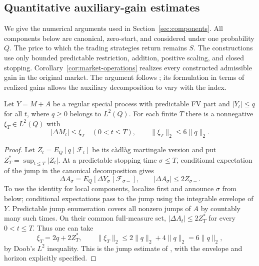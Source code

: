 \subsection{Quantitative auxiliary-gain estimates}
\label{sec:ds-estimates}
We give the numerical arguments used in Section~\ref{sec:components}.
All components below are canonical, zero-start, and considered under one
probability $Q$. The price to which the trading strategies return remains
$S$. The constructions use only bounded predictable restriction, addition,
positive scaling, and closed stopping. Corollary~\ref{cor:market-operations}
realizes every constructed admissible gain in the original market.
The argument follows \cite[Lemmas 4.7--4.10]{DS}; its formulation in terms of
realized gains allows the auxiliary decomposition to vary with the index.

\begin{lemma}\label{lem:explicit-jump-envelope}
Let $Y=M+A$ be a regular special process with predictable FV part and
$|Y_t|\leq q$ for all $t$, where $q\geq0$ belongs to $L^2(Q)$.
For each finite $T$ there is a nonnegative $\xi_T\in L^2(Q)$ with
\[
 |\Delta M_t|\leq\xi_T\quad(0<t\leq T),\qquad
 \|\xi_T\|_2\leq6\|q\|_2.
\]
\end{lemma}
\begin{proof}
Let $Z_t=E_Q[q\mid\mathcal F_t]$ be its c\`adl\`ag martingale version and put
$Z_T^*=\sup_{t\leq T}|Z_t|$.
At a predictable stopping time $\sigma\leq T$, conditional expectation of
the jump in the canonical decomposition gives
\[
 \Delta A_\sigma=E_Q[\Delta Y_\sigma\mid\mathcal F_{\sigma-}],\qquad
 |\Delta A_\sigma|\leq2Z_{\sigma-}.
\]
To use the identity for local components, localize first and announce
$\sigma$ from below; conditional expectations pass to the jump using the
integrable envelope of $Y$. Predictable jump enumeration covers all nonzero
jumps of $A$ by countably many such times. On their common full-measure set,
$|\Delta A_t|\leq2Z_T^*$ for every $0<t\leq T$.
Thus one can take
\[
 \xi_T=2q+2Z_T^*,\qquad
 \|\xi_T\|_2\leq2\|q\|_2+4\|q\|_2=6\|q\|_2,
\]
by Doob's $L^2$ inequality. This is the jump estimate of
\cite[Corollary 2.4]{DS}, with the envelope and horizon explicitly specified.
\end{proof}

